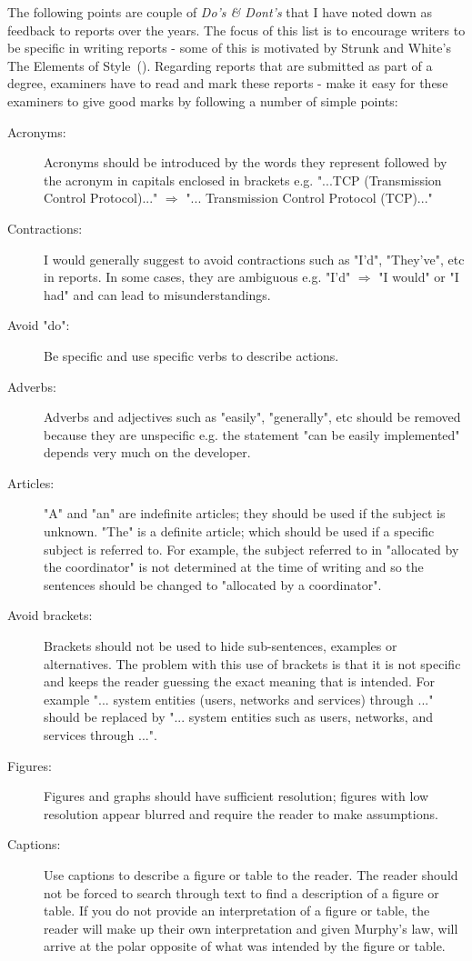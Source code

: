 The following points are couple of {\it Do's \& Dont's} that I have noted down as feedback to reports over the years. The focus of this list is to encourage writers to be specific in writing reports - some of this is motivated by Strunk and White's The Elements of Style~(\cite{9908579}). Regarding reports that are submitted as part of a degree, examiners have to read and mark these reports - make it easy for these examiners to give good marks by following a number of simple points:

\begin{description}
	\item [Acronyms:] Acronyms should be introduced by the words they represent followed by the acronym in capitals enclosed in brackets e.g. "...TCP (Transmission Control Protocol)..." $\Rightarrow$  "... Transmission Control Protocol (TCP)..."
	\item [Contractions:] I would generally suggest to avoid contractions such as "I'd", "They've", etc in reports. In some cases, they are ambiguous e.g. "I'd" $\Rightarrow$ "I would" or "I had" and can lead to misunderstandings.
	\item [Avoid "do":] Be specific and use specific verbs to describe actions.
	\item [Adverbs:] Adverbs and adjectives such as "easily", "generally", etc should be removed because they are unspecific e.g. the statement "can be easily implemented" depends very much on the developer. 
	\item [Articles:] "A" and "an" are indefinite articles; they should be used if the subject is unknown. "The" is a definite article; which should be used if a specific subject is referred to. For example, the subject referred to in "allocated by the coordinator" is not determined at the time of writing and so the sentences should be changed to "allocated by a coordinator".
	\item [Avoid brackets:] Brackets should not be used to hide sub-sentences, examples or alternatives. The problem with this use of brackets is that it is not specific and keeps the reader guessing the exact meaning that is intended. For example "... system entities (users, networks and services) through ..." should be replaced by "... system entities such as users, networks, and services through ...".
	\item [Figures:] Figures and graphs should have sufficient resolution; figures with low resolution appear blurred and require the reader to make assumptions.
	\item  [Captions:] Use captions to describe a figure or table to the reader. The reader should not be forced to search through text to find a description of a figure or table. If you do not provide an interpretation of a figure or table, the reader will make up their own interpretation and given Murphy's law, will arrive at the polar opposite of what was intended by the figure or table.

\end{description}
